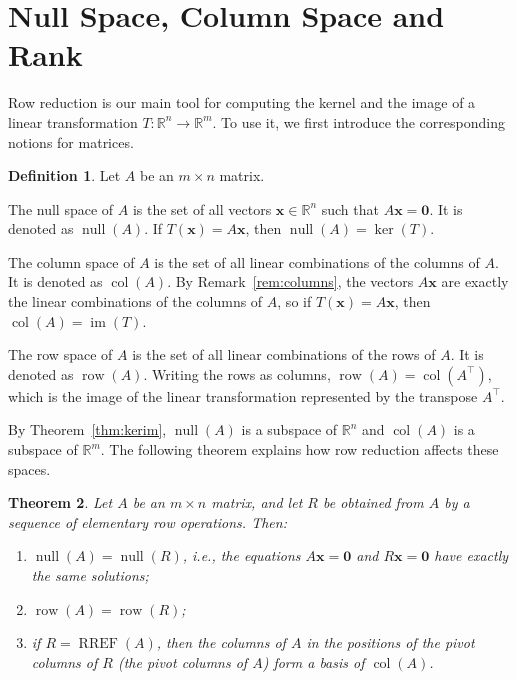 \documentclass[11pt]{article}
\theoremstyle{definition}
\newtheorem{definition}{Definition}[section]
\theoremstyle{plain}
\newtheorem{theorem}[definition]{Theorem}
\theoremstyle{remark}
\DeclareMathOperator{\im}{im}
\DeclareMathOperator{\Null}{null}
\DeclareMathOperator{\col}{col}
\DeclareMathOperator{\row}{row}
\DeclareMathOperator{\RREF}{RREF}
\begin{document}
\section{Null Space, Column Space and Rank}\label{sec:rank}

Row reduction is our main tool for computing the kernel and the image of a linear transformation $T: \mathbb{R}^n \to \mathbb{R}^m$. To use it, we first introduce the corresponding notions for matrices.

\begin{definition}
    Let $A$ be an $m \times n$ matrix.

    The null space of $A$ is the set of all vectors $\mathbf{x} \in \mathbb{R}^n$ such that $A\mathbf{x} = \mathbf{0}$. It is denoted as $\Null(A)$. If $T(\mathbf{x}) = A\mathbf{x}$, then $\Null(A) = \ker(T)$.

    The column space of $A$ is the set of all linear combinations of the columns of $A$. It is denoted as $\col(A)$. By Remark~\ref{rem:columns}, the vectors $A\mathbf{x}$ are exactly the linear combinations of the columns of $A$, so if $T(\mathbf{x}) = A\mathbf{x}$, then $\col(A) = \im(T)$.

    The row space of $A$ is the set of all linear combinations of the rows of $A$. It is denoted as $\row(A)$. Writing the rows as columns, $\row(A) = \col(A^\top)$, which is the image of the linear transformation represented by the transpose $A^\top$.
\end{definition}

By Theorem~\ref{thm:kerim}, $\Null(A)$ is a subspace of $\mathbb{R}^n$ and $\col(A)$ is a subspace of $\mathbb{R}^m$. The following theorem explains how row reduction affects these spaces.

\begin{theorem}\label{thm:rowops}
    Let $A$ be an $m \times n$ matrix, and let $R$ be obtained from $A$ by a sequence of elementary row operations. Then:
    \begin{enumerate}
        \item $\Null(A) = \Null(R)$, i.e., the equations $A\mathbf{x} = \mathbf{0}$ and $R\mathbf{x} = \mathbf{0}$ have exactly the same solutions;
        \item $\row(A) = \row(R)$;
        \item if $R = \RREF(A)$, then the columns of $A$ in the positions of the pivot columns of $R$ (the pivot columns of $A$) form a basis of $\col(A)$.
    \end{enumerate}
\end{theorem}
\end{document}
